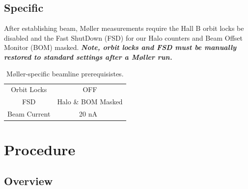 \documentclass[amsmath,amssymb,notitlepage,12pt]{revtex4}
\newcommand{\ibeam}{20 nA\ }
\begin{document}
\subsection{Specific}

After establishing beam, M{\o}ller measurements require the Hall B orbit locks be disabled and the Fast ShutDown (FSD) for our Halo counters and Beam Offset Monitor (BOM) masked.  {\bf\em Note, orbit locks and FSD must be manually restored to standard settings after a M{\o}ller run.}

\begin{table}[htbp]\centering
    \begin{tabular}{c|c}\toprule[1.5pt]
        Orbit Locks & OFF\\
        FSD & Halo \& BOM Masked\\
        Beam Current & \ibeam \\
        \bottomrule[1.5pt]
    \end{tabular}
    \caption{M{\o}ller-specific beamline prerequisistes.}
\end{table}

\newpage

\section{Procedure}

\subsection{Overview}
\end{document}
